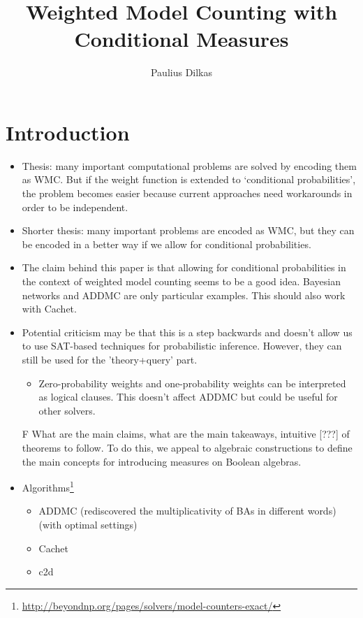 \documentclass{article}
\title{Weighted Model Counting with Conditional Measures}
\author{Paulius Dilkas}
\theoremstyle{definition}
\theoremstyle{remark}
\begin{document}
\maketitle

\section{Introduction}

\begin{itemize}
\item Thesis: many important computational problems are solved by encoding them
  as WMC. But if the weight function is extended to `conditional probabilities',
  the problem becomes easier because current approaches need workarounds in
  order to be independent.
\item Shorter thesis: many important problems are encoded as WMC, but they can
  be encoded in a better way if we allow for conditional probabilities.
\item The claim behind this paper is that allowing for conditional probabilities
  in the context of weighted model counting seems to be a good idea. Bayesian
  networks and ADDMC are only particular examples. This should also work with
  Cachet.
\item Potential criticism may be that this is a step backwards and doesn't allow
  us to use SAT-based techniques for probabilistic inference. However, they can
  still be used for the 'theory+query' part.
  \begin{itemize}
  \item Zero-probability weights and one-probability weights can be interpreted
    as logical clauses. This doesn't affect ADDMC but could be useful for other
    solvers.
  \end{itemize}
\item[F] What are the main claims, what are the main takeaways, intuitive [???]
  of theorems to follow. To do this, we appeal to algebraic constructions to
  define the main concepts for introducing measures on Boolean algebras.
\item
  Algorithms\footnote{\url{http://beyondnp.org/pages/solvers/model-counters-exact/}}
  \begin{itemize}
  \item ADDMC \cite{DBLP:conf/aaai/DudekPV20} (rediscovered the
    multiplicativity of BAs in different words) (with optimal settings)
  \item Cachet \cite{DBLP:conf/sat/SangBBKP04}
  \item c2d \cite{DBLP:conf/ecai/Darwiche04}

\end{itemize}
\end{itemize}
\end{document}
